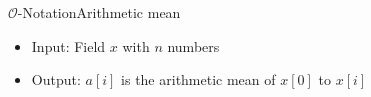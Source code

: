 
\begin{frame}{$\mathcal{O}$-Notation}{Arithmetic mean}
  \begin{itemize}
    \item
      {\color{Mittel-Blau}Input:} Field $x$ with $n$ numbers
    \item
      {\color{Mittel-Blau}Output:} $a[i]$ is the arithmetic mean of $x[0]$ to 
      $x[i]$
  \end{itemize}
  
\end{frame}


